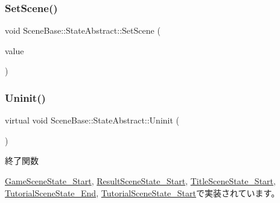 \subsubsection{\texorpdfstring{Set\+Scene()}{SetScene()}}
{\footnotesize\ttfamily void Scene\+Base\+::\+State\+Abstract\+::\+Set\+Scene (\begin{DoxyParamCaption}\item[{\mbox{\hyperlink{class_scene_base}{Scene\+Base}} $\ast$}]{value }\end{DoxyParamCaption})\hspace{0.3cm}{\ttfamily [inline]}}

\mbox{\label{class_scene_base_1_1_state_abstract_a7a92fbd3fd68177a4e807bf7c359641c}} 
\subsubsection{\texorpdfstring{Uninit()}{Uninit()}}
{\footnotesize\ttfamily virtual void Scene\+Base\+::\+State\+Abstract\+::\+Uninit (\begin{DoxyParamCaption}{ }\end{DoxyParamCaption})\hspace{0.3cm}{\ttfamily [pure virtual]}}



終了関数 



\mbox{\hyperlink{class_game_scene_state___start_a636df8b7ac0173b044b0efc2927fb83b}{Game\+Scene\+State\+\_\+\+Start}}, \mbox{\hyperlink{class_result_scene_state___start_af5b9af607074e3296481a1660607fb9a}{Result\+Scene\+State\+\_\+\+Start}}, \mbox{\hyperlink{class_title_scene_state___start_a5bcb4d7a9250ea1c0041c38616ffabfe}{Title\+Scene\+State\+\_\+\+Start}}, \mbox{\hyperlink{class_tutorial_scene_state___end_aafc0d8d042de8c7f79d84fcdc35a807c}{Tutorial\+Scene\+State\+\_\+\+End}}, \mbox{\hyperlink{class_tutorial_scene_state___start_a974962addfb0bcba90fbab64ac6d50f0}{Tutorial\+Scene\+State\+\_\+\+Start}}で実装されています。

\mbox{\label{class_scene_base_1_1_state_abstract_a7fca4c5e7d0174af8a147c404f4e6eee}} 
